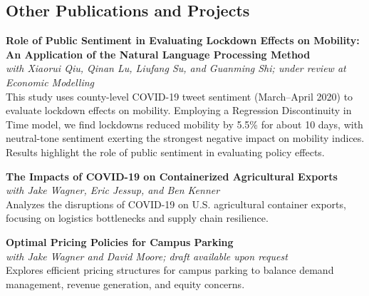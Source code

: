 \documentclass[11pt,letterpaper]{article}
\begin{document}
\subsection{Other Publications and Projects}

\textbf{Role of Public Sentiment in Evaluating Lockdown Effects on Mobility: An Application of the Natural Language Processing Method} \\
\textit{with Xiaorui Qiu, Qinan Lu, Liufang Su, and Guanming Shi; under review at \textit{Economic Modelling}} \\[4pt]
This study uses county-level COVID-19 tweet sentiment (March–April 2020) to evaluate lockdown effects on mobility. Employing a Regression Discontinuity in Time model, we find lockdowns reduced mobility by 5.5\% for about 10 days, with neutral-tone sentiment exerting the strongest negative impact on mobility indices. Results highlight the role of public sentiment in evaluating policy effects.

\textbf{The Impacts of COVID-19 on Containerized Agricultural Exports} \\
\textit{with Jake Wagner, Eric Jessup, and Ben Kenner} \\[4pt]
Analyzes the disruptions of COVID-19 on U.S. agricultural container exports, focusing on logistics bottlenecks and supply chain resilience.  

\textbf{Optimal Pricing Policies for Campus Parking} \\
\textit{with Jake Wagner and David Moore; draft available upon request} \\[4pt]
Explores efficient pricing structures for campus parking to balance demand management, revenue generation, and equity concerns.  
\end{document}
